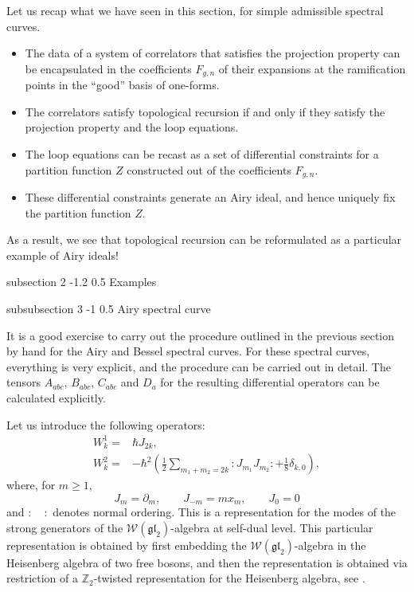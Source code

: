 \documentclass[reqno,oneside,11pt]{amsart}
\makeatletter
\theoremstyle{plain}
\theoremstyle{definition}
\theoremstyle{remark}
\numberwithin{equation}{section}
\renewcommand{\subsection}{\@startsection
{subsection}%
{2}%
{\z@}%
{-1.2\baselineskip}%
{0.5\baselineskip}%
{\normalfont \bf \normalsize}} %
\renewcommand{\subsubsection}{\@startsection
{subsubsection}%
{3}%
{\z@}%
{-1\baselineskip}%
{0.5\baselineskip}%
{\normalfont \it \normalsize}} %
\makeatother
\begin{document}
Let us recap what we have seen in this section, for simple admissible spectral curves.
\begin{itemize}
\item The data of a system of correlators that satisfies the projection property can be encapsulated in the coefficients $F_{g,n}$ of their expansions at the ramification points in the ``good'' basis of one-forms.
\item The correlators satisfy topological recursion if and only if they satisfy the projection property and the loop equations.
\item The loop equations can be recast as a set of differential constraints for a partition function $Z$ constructed out of the coefficients $F_{g,n}$.
\item These differential constraints generate an Airy ideal, and hence uniquely fix the partition function $Z$.
\end{itemize}
As a result, we see that topological recursion can be reformulated as a particular example of Airy ideals!


\subsection{Examples}

\subsubsection{Airy spectral curve}

It is a good exercise to carry out the procedure outlined in the previous section by hand for the Airy and Bessel spectral curves. For these spectral curves, everything is very explicit, and the procedure can be carried out in detail. The tensors $A_{abc}$, $B_{abc}$, $C_{abc}$ and $D_a$ for the resulting differential operators can be calculated explicitly.

Let us introduce the following operators:
\begin{align}\label{eq:Ws}
W^1_k =&\hbar J_{2k},\nonumber\\
W^2_k =& - \hbar^2 \left( \frac{1}{2}\sum_{m_1+m_2 =2 k} : J_{m_1} J_{m_2}: + \frac{1}{8}\delta_{k,0} \right),
\end{align}
where, for $m \geq 1$, 
\begin{equation}
J_m =\partial_m, \qquad J_{-m} = m x_m, \qquad J_0 = 0
\end{equation}
and $: \quad :$ denotes normal ordering. 
This is a representation for the modes of the strong generators of the $\mathcal{W}(\mathfrak{gl}_2)$-algebra at self-dual level. This particular representation is obtained by first embedding the $\mathcal{W}(\mathfrak{gl}_2)$-algebra in the Heisenberg algebra of two free bosons, and then the representation is obtained via restriction of a $\mathbb{Z}_2$-twisted representation for the Heisenberg algebra, see \cite{BBCCN18}. 
\end{document}
